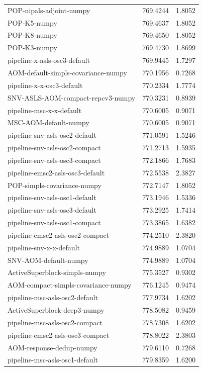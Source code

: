 \begin{tabular}{lrr}
POP-nipals-adjoint-numpy & 769.4244 & 1.8052 \\
POP-K5-numpy & 769.4637 & 1.8052 \\
POP-K8-numpy & 769.4650 & 1.8052 \\
POP-K3-numpy & 769.4730 & 1.8699 \\
pipeline-x-asls-osc3-default & 769.9445 & 1.7297 \\
AOM-default-simpls-covariance-numpy & 770.1956 & 0.7268 \\
pipeline-x-x-osc3-default & 770.2334 & 1.7774 \\
SNV-ASLS-AOM-compact-repcv3-numpy & 770.3231 & 0.8939 \\
pipeline-msc-x-x-default & 770.6005 & 0.9071 \\
MSC-AOM-default-numpy & 770.6005 & 0.9071 \\
pipeline-snv-asls-osc2-default & 771.0591 & 1.5246 \\
pipeline-snv-asls-osc2-compact & 771.2713 & 1.5935 \\
pipeline-snv-asls-osc3-compact & 772.1866 & 1.7683 \\
pipeline-emsc2-asls-osc3-default & 772.5538 & 2.3827 \\
POP-simpls-covariance-numpy & 772.7147 & 1.8052 \\
pipeline-snv-asls-osc1-default & 773.1946 & 1.5336 \\
pipeline-snv-asls-osc3-default & 773.2925 & 1.7414 \\
pipeline-snv-asls-osc1-compact & 773.3865 & 1.6382 \\
pipeline-emsc2-asls-osc2-compact & 774.2510 & 2.3820 \\
pipeline-snv-x-x-default & 774.9889 & 1.0704 \\
SNV-AOM-default-numpy & 774.9889 & 1.0704 \\
ActiveSuperblock-simpls-numpy & 775.3527 & 0.9302 \\
AOM-compact-simpls-covariance-numpy & 776.1245 & 0.9474 \\
pipeline-msc-asls-osc2-default & 777.9734 & 1.6202 \\
ActiveSuperblock-deep3-numpy & 778.5082 & 0.9459 \\
pipeline-msc-asls-osc2-compact & 778.7308 & 1.6202 \\
pipeline-emsc2-asls-osc3-compact & 778.8022 & 2.3803 \\
AOM-response-dedup-numpy & 779.6110 & 0.7268 \\
pipeline-msc-asls-osc1-default & 779.8359 & 1.6200 \\

\end{tabular}
